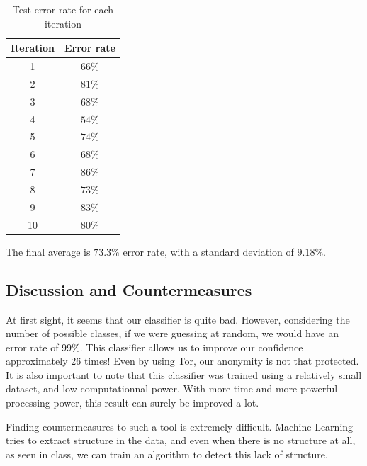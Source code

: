 \documentclass[10pt,conference,compsocconf]{IEEEtran}
\begin{document}
\begin{table}
    \centering
    \begin{tabular}{|c|c|}
        \hline
        Iteration & Error rate      \\
        \hline
        1      & $66\%$  \\
        \hline
        2      & $81\%$  \\
        \hline
        3      & $68\%$  \\
        \hline
        4      & $54\%$  \\
        \hline 
        5      & $74\%$  \\
        \hline
        6      & $68\%$  \\
        \hline 
        7      & $86\%$  \\
        \hline
        8      & $73\%$  \\
        \hline 
        9      & $83\%$  \\
        \hline
        10      & $80\%$  \\
        \hline      
    \end{tabular}
    \caption{Test error rate for each iteration}
    \label{test_error}
\end{table}

The final average is $73.3\%$ error rate, with a standard deviation of $9.18\%$.

\subsection{Discussion and Countermeasures}
At first sight, it seems that our classifier is quite bad. However, considering the number of possible classes, if we were guessing at random, we would have an error rate of $99\%$. This classifier allows us to improve our confidence approximately 26 times! Even by using Tor, our anonymity is not that protected. It is also important to note that this classifier was trained using a relatively small dataset, and low computationnal power. With more time and more powerful processing power, this result can surely be improved a lot.

Finding countermeasures to such a tool is extremely difficult. Machine Learning tries to extract structure in the data, and even when there is no structure at all, as seen in class, we can train an algorithm to detect this lack of structure. 



\end{document}
